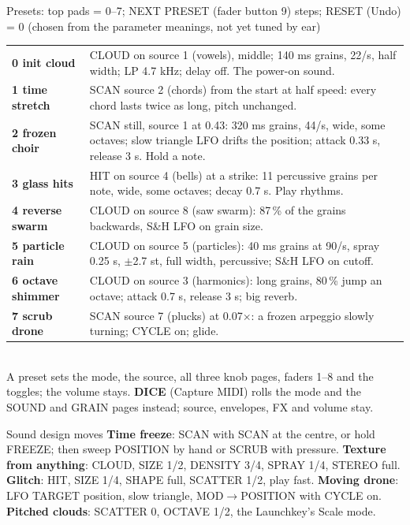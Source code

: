 \documentclass{article}
\begin{document}
\begin{minipage}[t]{166mm}
\begin{card}{Presets: top pads = 0--7; NEXT PRESET (fader button 9) steps; RESET (Undo) = 0 \quad\textmd{\fontsize{6.5}{7}\selectfont (chosen from the parameter meanings, not yet tuned by ear)}}
\fontsize{7.2}{8.7}\selectfont
\begin{tabularx}{\linewidth}{@{}>{\bfseries}l L@{}}
0 init cloud & CLOUD on source 1 (vowels), middle; 140 ms grains, 22/s, half width; LP 4.7 kHz; delay off. The power-on sound. \\
1 time stretch & SCAN source 2 (chords) from the start at half speed: every chord lasts twice as long, pitch unchanged. \\
2 frozen choir & SCAN still, source 1 at 0.43: 320 ms grains, 44/s, wide, some octaves; slow triangle LFO drifts the
position; attack 0.33 s, release 3 s. Hold a note. \\
3 glass hits & HIT on source 4 (bells) at a strike: 11 percussive grains per note, wide, some octaves; decay 0.7 s. Play rhythms. \\
4 reverse swarm & CLOUD on source 8 (saw swarm): 87\,\% of the grains backwards, S\&H LFO on grain size. \\
5 particle rain & CLOUD on source 5 (particles): 40 ms grains at 90/s, spray 0.25 s, \(\pm\)2.7 st, full width,
percussive; S\&H LFO on cutoff. \\
6 octave shimmer & CLOUD on source 3 (harmonics): long grains, 80\,\% jump an octave; attack 0.7 s, release 3 s; big reverb. \\
7 scrub drone & SCAN source 7 (plucks) at 0.07\(\times\): a frozen arpeggio slowly turning; CYCLE on; glide. \\
\end{tabularx}\\[0.3mm]
A preset sets the mode, the source, all three knob pages, faders 1--8 and the toggles; the volume stays.
\textbf{DICE} (Capture MIDI) rolls the mode and the SOUND and GRAIN pages instead; source, envelopes, FX and volume stay.
\end{card}

\begin{card}{Sound design moves}
\fontsize{7.4}{9.0}\selectfont
\textbf{Time freeze}: SCAN with SCAN at the centre, or hold FREEZE; then sweep POSITION by hand or SCRUB with pressure.\quad
\textbf{Texture from anything}: CLOUD, SIZE 1/2, DENSITY 3/4, SPRAY 1/4, STEREO full.\quad
\textbf{Glitch}: HIT, SIZE 1/4, SHAPE full, SCATTER 1/2, play fast.\quad
\textbf{Moving drone}: LFO TARGET position, slow triangle, MOD\(\to\)POSITION with CYCLE on.\quad
\textbf{Pitched clouds}: SCATTER 0, OCTAVE 1/2, the Launchkey's Scale mode.
\end{card}
\end{minipage}\hfill
\end{document}
